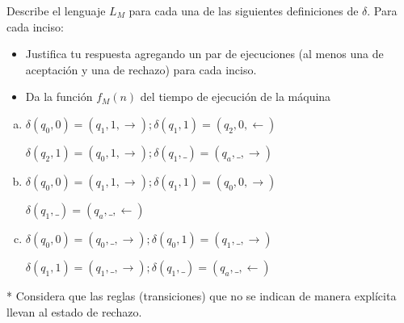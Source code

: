 \documentclass[12pt,letterpaper]{article}
\begin{document}
Describe el lenguaje $L_M$ para cada una de las siguientes definiciones de $\delta$. Para cada inciso:

\begin{itemize}
    \item Justifica tu respuesta agregando un par de ejecuciones (al menos una de aceptación y una de rechazo) para cada inciso.
    
    \item Da la función $f_M(n)$ del tiempo de ejecución de la máquina
\end{itemize}

\begin{enumerate}[a.]
    \item $\delta(q_0, 0) = (q_1, 1, \xrightarrow{}); \delta(q_1, 1) = (q_2, 0, \xleftarrow{})$
    
    $\delta(q_2, 1) = (q_0, 1, \xrightarrow{}); \delta(q_1, \_ ) = (q_a, \_, \xrightarrow{})$
    
    \item $\delta(q_0, 0) = (q_1, 1, \xrightarrow{}); \delta(q_1, 1) = (q_0, 0, \xrightarrow{})$
    
    $\delta(q_1, \_) = (q_a, \_, \xleftarrow{} )$
    
    \item $\delta(q_0, 0) = (q_0, \_, \xrightarrow{}); \delta(q_0, 1) = (q_1, \_, \xrightarrow{})$
    
    $\delta(q_1, 1) = (q_1, \_, \xrightarrow{}); \delta(q_1, \_ ) = (q_a, \_, \xleftarrow{})$
    
\end{enumerate}
* Considera que las reglas (transiciones) que no se indican de manera explícita llevan al estado de rechazo.
\newpage
\end{document}
